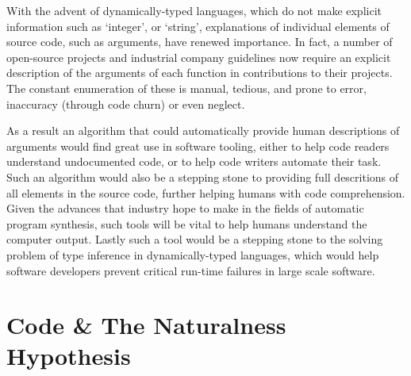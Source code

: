 With the advent of dynamically-typed languages, which do not make explicit information such as `integer', or `string', explanations of individual elements of source code, such as arguments, have renewed importance.
In fact, a number of open-source projects  \cite{noauthor_numpydoc_nodate} and industrial company guidelines \cite{noauthor_style_2018} now require an explicit description of the arguments of each function in contributions to their projects.
The constant enumeration of these is manual, tedious, and prone to error, inaccuracy (through code churn) or even neglect.

As a result an algorithm that could automatically provide human descriptions of arguments would find great use in software tooling, either to help code readers understand undocumented code, or to help code writers automate their task.
Such an algorithm would also be a stepping stone to providing full descritions of all elements in the source code, further helping humans with code comprehension.
Given the advances that industry hope to make in the fields of automatic program synthesis, such tools will be vital to help humans understand
the computer output.
Lastly such a tool would be a stepping stone to the solving problem of type inference in dynamically-typed languages, which would help software developers prevent critical run-time failures in large scale software.



\section{Code \& The Naturalness Hypothesis} %
\label{sec:code_and_natural_language}



